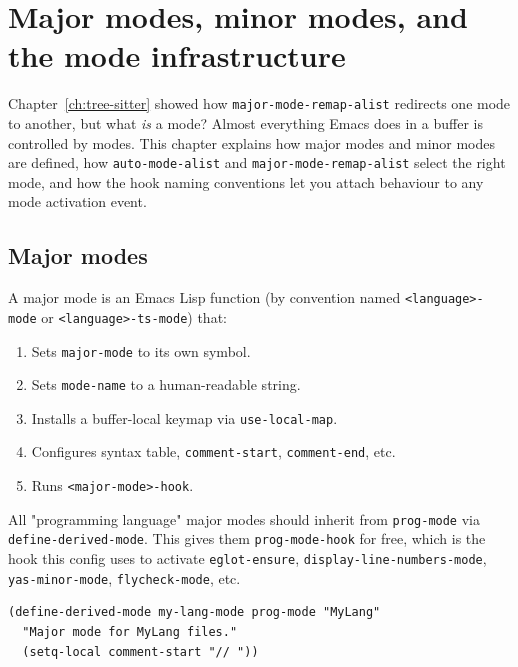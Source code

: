 \chapter{Major modes, minor modes, and the mode infrastructure}
\label{ch:major-minor-modes}
\minitoc\label{major-modes-minor-modes-and-the-mode-infrastructure}

Chapter~\ref{ch:tree-sitter} showed how
\texttt{major-mode-remap-alist} redirects one mode to another, but
what \emph{is} a mode?  Almost everything Emacs does in a buffer is
controlled by modes.
This chapter explains how major modes and minor modes are defined,
how \texttt{auto-mode-alist} and \texttt{major-mode-remap-alist}
select the right mode, and how the hook naming conventions let you
attach behaviour to any mode activation event.

\section{Major modes}\label{major-modes}

A major mode is an Emacs Lisp function (by convention named \texttt{<language>-mode} or \texttt{<language>-ts-mode}) that:

\begin{enumerate}
\item Sets \texttt{major-mode} to its own symbol.
\item Sets \texttt{mode-name} to a human-readable string.
\item Installs a buffer-local keymap via \texttt{use-local-map}.
\item Configures syntax table, \texttt{comment-start}, \texttt{comment-end}, etc.
\item Runs \texttt{<major-mode>-hook}.
\end{enumerate}

All "programming language" major modes should inherit from \texttt{prog-mode} via \texttt{define-derived-mode}. This gives them \texttt{prog-mode-hook} for free, which is the hook this config uses to activate \texttt{eglot-ensure}, \texttt{display-line-numbers-mode}, \texttt{yas-minor-mode}, \texttt{flycheck-mode}, etc.

\begin{verbatim}
(define-derived-mode my-lang-mode prog-mode "MyLang"
  "Major mode for MyLang files."
  (setq-local comment-start "// "))
\end{verbatim}

